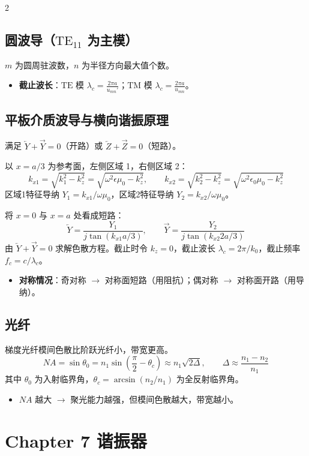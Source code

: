 \documentclass[10pt,a4paper,landscape]{article}
\begin{document}
\begin{multicols}{2}
\subsection{圆波导（$\text{TE}_{11}$ 为主模）}
$m$ 为圆周驻波数，$n$ 为半径方向最大值个数。
\begin{itemize}
    \item \textbf{截止波长}：$\text{TE}$ 模 $\lambda_c = \frac{2\pi a}{u_{mn}'}$；$\text{TM}$ 模 $\lambda_c = \frac{2\pi a}{u_{mn}}$。
\end{itemize}

\subsection{平板介质波导与横向谐振原理}
满足 $\overleftarrow{Y} + \overrightarrow{Y} = 0$（开路）或 $\overleftarrow{Z} + \overrightarrow{Z} = 0$（短路）。

以 $x=a/3$ 为参考面，左侧区域 1，右侧区域 2：
\[
k_{x1} = \sqrt{k_1^2 - k_z^2} = \sqrt{\omega^2\epsilon\mu_0 - k_z^2}, \qquad k_{x2} = \sqrt{k_2^2 - k_z^2} = \sqrt{\omega^2\epsilon_0\mu_0 - k_z^2}
\]
区域1特征导纳 $Y_1 = k_{x1}/\omega\mu_0$，区域2特征导纳 $Y_2 = k_{x2}/\omega\mu_0$。

将 $x=0$ 与 $x=a$ 处看成短路：
\[
\overleftarrow{Y} = \frac{Y_1}{j\tan(k_{x1}a/3)}, \qquad \overrightarrow{Y} = \frac{Y_2}{j\tan(k_{x2}2a/3)}
\]
由 $\overleftarrow{Y}+\overrightarrow{Y}=0$ 求解色散方程。截止时令 $k_z=0$，截止波长 $\lambda_c = 2\pi/k_0$，截止频率 $f_c = c/\lambda_c$。
\begin{itemize}
    \item \textbf{对称情况}：奇对称 $\rightarrow$ 对称面短路（用阻抗）；偶对称 $\rightarrow$ 对称面开路（用导纳）。
\end{itemize}

\subsection{光纤}
梯度光纤模间色散比阶跃光纤小，带宽更高。
\[
NA = \sin\theta_0 = n_1\sin\left(\frac{\pi}{2} - \theta_c\right) \approx n_1\sqrt{2\Delta}, \qquad \Delta \approx \frac{n_1 - n_2}{n_1}
\]
其中 $\theta_0$ 为入射临界角，$\theta_c = \arcsin(n_2/n_1)$ 为全反射临界角。
\begin{itemize}
    \item $NA$ 越大 $\rightarrow$ 聚光能力越强，但模间色散越大，带宽越小。
\end{itemize}

\section{Chapter 7 谐振器}

\end{multicols}
\end{document}
